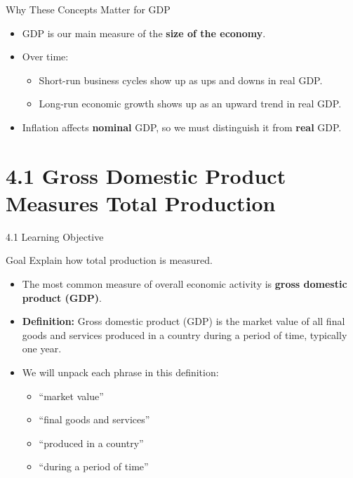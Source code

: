 \documentclass[aspectratio=169]{beamer}
\begin{document}







\begin{frame}{Why These Concepts Matter for GDP}
\transfade
\begin{itemize}[<+->]
  \item GDP is our main measure of the \textbf{size of the economy}.
  \item Over time:
  \begin{itemize}[<+->]
    \item Short-run \alert{business cycles} show up as ups and downs in real GDP.
    \item Long-run \alert{economic growth} shows up as an upward trend in real GDP.
  \end{itemize}
  \item Inflation affects \textbf{nominal} GDP, so we must distinguish it from \textbf{real} GDP.
\end{itemize}
\end{frame}

\section{4.1 Gross Domestic Product Measures Total Production}

\begin{frame}{4.1 Learning Objective}
\transfade
\begin{block}{Goal}
Explain how total production is measured.
\end{block}
\begin{itemize}[<+->]
  \item The most common measure of overall economic activity is \textbf{gross domestic product (GDP)}.
  \item \textbf{Definition:}  
  Gross domestic product (GDP) is the \alert{market value of all final goods and services produced in a country during a period of time}, typically one year.
  \item We will unpack each phrase in this definition:
  \begin{itemize}[<+->]
    \item ``market value''
    \item ``final goods and services''
    \item ``produced in a country''
    \item ``during a period of time''
  \end{itemize}
\end{itemize}
\end{frame}
\end{document}
